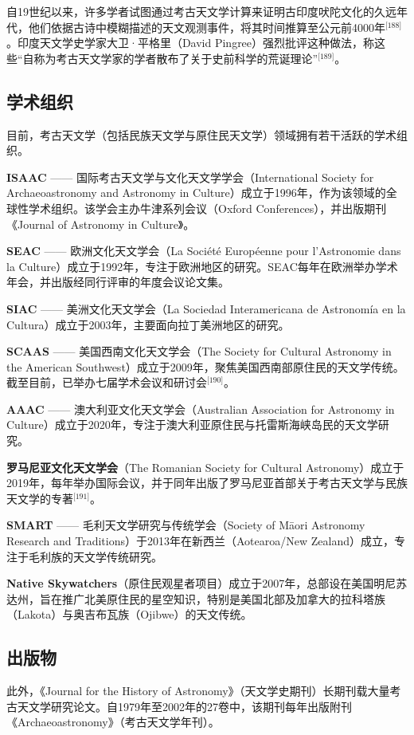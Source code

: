 自19世纪以来，许多学者试图通过考古天文学计算来证明古印度吠陀文化的久远年代，他们依据古诗中模糊描述的天文观测事件，将其时间推算至公元前4000年\(^\text{[188]}\)。印度天文学史学家大卫·平格里（David Pingree）强烈批评这种做法，称这些“自称为考古天文学家的学者散布了关于史前科学的荒诞理论”\(^\text{[189]}\)。
\subsection{学术组织}
目前，考古天文学（包括民族天文学与原住民天文学）领域拥有若干活跃的学术组织。

\textbf{ISAAC} —— 国际考古天文学与文化天文学学会（International Society for Archaeoastronomy and Astronomy in Culture）成立于1996年，作为该领域的全球性学术组织。该学会主办牛津系列会议（Oxford Conferences），并出版期刊《Journal of Astronomy in Culture》。

\textbf{SEAC} —— 欧洲文化天文学会（La Société Européenne pour l'Astronomie dans la Culture）成立于1992年，专注于欧洲地区的研究。SEAC每年在欧洲举办学术年会，并出版经同行评审的年度会议论文集。

\textbf{SIAC} —— 美洲文化天文学会（La Sociedad Interamericana de Astronomía en la Cultura）成立于2003年，主要面向拉丁美洲地区的研究。

\textbf{SCAAS} —— 美国西南文化天文学会（The Society for Cultural Astronomy in the American Southwest）成立于2009年，聚焦美国西南部原住民的天文学传统。截至目前，已举办七届学术会议和研讨会\(^\text{[190]}\)。

\textbf{AAAC} —— 澳大利亚文化天文学会（Australian Association for Astronomy in Culture）成立于2020年，专注于澳大利亚原住民与托雷斯海峡岛民的天文学研究。

\textbf{罗马尼亚文化天文学会}（The Romanian Society for Cultural Astronomy）成立于2019年，每年举办国际会议，并于同年出版了罗马尼亚首部关于考古天文学与民族天文学的专著\(^\text{[191]}\)。

\textbf{SMART} —— 毛利天文学研究与传统学会（Society of Māori Astronomy Research and Traditions）于2013年在新西兰（Aotearoa/New Zealand）成立，专注于毛利族的天文学传统研究。

\textbf{Native Skywatchers}（原住民观星者项目）成立于2007年，总部设在美国明尼苏达州，旨在推广北美原住民的星空知识，特别是美国北部及加拿大的拉科塔族（Lakota）与奥吉布瓦族（Ojibwe）的天文传统。
\subsection{出版物}
此外，《Journal for the History of Astronomy》（天文学史期刊）长期刊载大量考古天文学研究论文。自1979年至2002年的27卷中，该期刊每年出版附刊《Archaeoastronomy》（考古天文学年刊）。

